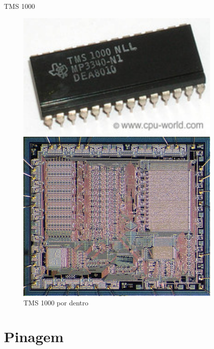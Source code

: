 \documentclass[t]{beamer}
\begin{document}
\begin{frame}{TMS 1000}
	\begin{figure}[ht]
		\begin{minipage}[b]{0.45\linewidth}
			\centering
			\includegraphics[width=0.9\textwidth]{TMS1000}
			\caption{TMS 1000 por fora}
		\end{minipage}
		\hspace{0.5cm}
		\begin{minipage}[b]{0.45\linewidth}
			\centering
				\includegraphics[width=0.9\textwidth]{TMS1000C_die}
			\caption{TMS 1000 por dentro}
		\end{minipage}
	\end{figure}
\end{frame}

\section{Pinagem}
\end{document}
